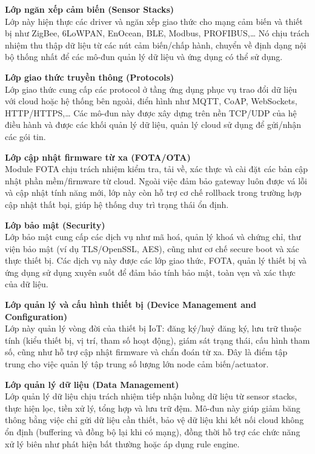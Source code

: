                     \textbf{Lớp ngăn xếp cảm biến (Sensor Stacks)}\\
                        Lớp này hiện thực các driver và ngăn xếp giao thức cho mạng cảm biến và thiết bị như ZigBee, 6LoWPAN, EnOcean, BLE, Modbus, PROFIBUS,\dots{} Nó chịu trách nhiệm thu thập dữ liệu từ các nút cảm biến/chấp hành, chuyển về định dạng nội bộ thống nhất để các mô-đun quản lý dữ liệu và ứng dụng có thể sử dụng.
                    
                    \textbf{Lớp giao thức truyền thông (Protocols)}\\
                        Lớp giao thức cung cấp các protocol ở tầng ứng dụng phục vụ trao đổi dữ liệu với cloud hoặc hệ thống bên ngoài, điển hình như MQTT, CoAP, WebSockets, HTTP/HTTPS,\dots{} Các mô-đun này được xây dựng trên nền TCP/UDP của hệ điều hành và được các khối quản lý dữ liệu, quản lý cloud sử dụng để gửi/nhận các gói tin.
                    
                    \textbf{Lớp cập nhật firmware từ xa (FOTA/OTA)}\\
                        Module FOTA chịu trách nhiệm kiểm tra, tải về, xác thực và cài đặt các bản cập nhật phần mềm/firmware từ cloud. Ngoài việc đảm bảo gateway luôn được vá lỗi và cập nhật tính năng mới, lớp này còn hỗ trợ cơ chế rollback trong trường hợp cập nhật thất bại, giúp hệ thống duy trì trạng thái ổn định.
                    
                    \textbf{Lớp bảo mật (Security)}\\
                        Lớp bảo mật cung cấp các dịch vụ như mã hoá, quản lý khoá và chứng chỉ, thư viện bảo mật (ví dụ TLS/OpenSSL, AES), cũng như cơ chế secure boot và xác thực thiết bị. Các dịch vụ này được các lớp giao thức, FOTA, quản lý thiết bị và ứng dụng sử dụng xuyên suốt để đảm bảo tính bảo mật, toàn vẹn và xác thực của dữ liệu.
                    
                    \textbf{Lớp quản lý và cấu hình thiết bị (Device Management and Configuration)}\\
                        Lớp này quản lý vòng đời của thiết bị IoT: đăng ký/huỷ đăng ký, lưu trữ thuộc tính (kiểu thiết bị, vị trí, tham số hoạt động), giám sát trạng thái, cấu hình tham số, cũng như hỗ trợ cập nhật firmware và chẩn đoán từ xa. Đây là điểm tập trung cho việc quản lý tập trung số lượng lớn node cảm biến/actuator.
                    
                    \textbf{Lớp quản lý dữ liệu (Data Management)}\\
                        Lớp quản lý dữ liệu chịu trách nhiệm tiếp nhận luồng dữ liệu từ sensor stacks, thực hiện lọc, tiền xử lý, tổng hợp và lưu trữ đệm. Mô-đun này giúp giảm băng thông bằng việc chỉ gửi dữ liệu cần thiết, bảo vệ dữ liệu khi kết nối cloud không ổn định (buffering và đồng bộ lại khi có mạng), đồng thời hỗ trợ các chức năng xử lý biên như phát hiện bất thường hoặc áp dụng rule engine.
                    
